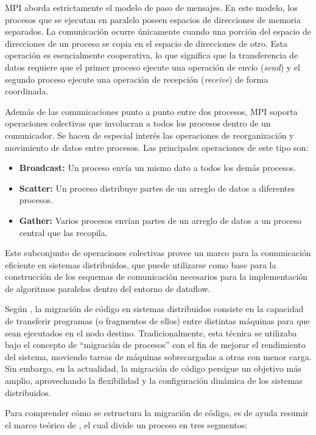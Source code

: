 MPI aborda estrictamente el modelo de paso de mensajes. En este modelo, los procesos que se ejecutan en paralelo poseen espacios de direcciones de memoria separados. La comunicación ocurre únicamente cuando una porción del espacio de direcciones de un proceso se copia en el espacio de direcciones de otro. Esta operación es esencialmente cooperativa, lo que significa que la transferencia de datos requiere que el primer proceso ejecute una operación de envío (\emph{send}) y el segundo proceso ejecute una operación de recepción (\emph{receive}) de forma coordinada.

Además de las comunicaciones punto a punto entre dos procesos, MPI soporta operaciones colectivas que involucran a todos los procesos dentro de un comunicador. Se hacen de especial interés las operaciones de reorganización y movimiento de datos entre procesos. Las principales operaciones de este tipo son:

\begin{itemize}
    \item \textbf{Broadcast:} Un proceso envía un mismo dato a todos los demás procesos.
    \item \textbf{Scatter:} Un proceso distribuye partes de un arreglo de datos a diferentes procesos.
    \item \textbf{Gather:} Varios procesos envían partes de un arreglo de datos a un proceso central que las recopila.
\end{itemize}

Este subconjunto de operaciones colectivas provee un marco para la comunicación eficiente en sistemas distribuidos, que puede utilizarse como base para la construcción de los esquemas de comunicación necesarios para la implementación de algoritmos paralelos dentro del entorno de dataflow.


Según , la migración de código en sistemas distribuidos consiste en la capacidad de transferir programas (o fragmentos de ellos) entre distintas máquinas para que sean ejecutados en el nodo destino. Tradicionalmente, esta técnica se utilizaba bajo el concepto de “migración de procesos” con el fin de mejorar el rendimiento del sistema, moviendo tareas de máquinas sobrecargadas a otras con menor carga. Sin embargo, en la actualidad, la migración de código persigue un objetivo más amplio, aprovechando la flexibilidad y la configuración dinámica de los sistemas distribuidos.

Para comprender cómo se estructura la migración de código, es de ayuda resumir el marco teórico de , el cual divide un proceso en tres segmentos:

